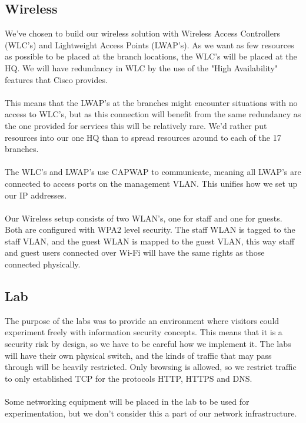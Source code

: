 \subsection{Wireless}


We've chosen to build our wireless solution with Wireless Access Controllers (WLC's) and Lightweight Access Points (LWAP's). As we want as few resources as possible to be placed at the branch locations, the WLC's will be placed at the HQ. We will have redundancy in WLC by the use of the "High Availability" features that Cisco provides.~\cite{ciscoha}
\\
\\
This means that the LWAP's at the branches might encounter situations with no access to WLC's, but as this connection will benefit from the same redundancy as the one provided for services this will be relatively rare. We'd rather put resources into our one HQ than to spread resources around to each of the 17 branches.
\\
\\
The WLC's and LWAP's use CAPWAP to communicate, meaning all LWAP's are connected to access ports on the management VLAN. This unifies how we set up our IP addresses.
\\
\\
Our Wireless setup consists of two WLAN's, one for staff and one for guests. Both are configured with WPA2 level security. The staff WLAN is tagged to the staff VLAN, and the guest WLAN is mapped to the guest VLAN, this way staff and guest users connected over Wi-Fi will have the same rights as those connected physically.

\subsection{Lab}


The purpose of the labs was to provide an environment where visitors could experiment freely with information security concepts. This means that it is a security risk by design, so we have to be careful how we implement it. The labs will have their own physical switch, and the kinds of traffic that may pass through will be heavily restricted. Only browsing is allowed, so we restrict traffic to only established TCP for the protocols HTTP, HTTPS and DNS.
\\
\\
Some networking equipment will be placed in the lab to be used for experimentation, but we don't consider this a part of our network infrastructure.

